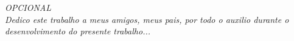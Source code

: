 \begin{dedicatoria}
   \vspace*{\fill}
   \centering
   \noindent
   \textit{ 
   OPCIONAL\\ Dedico este trabalho a meus amigos, meus pais, por todo o auxilio durante o desenvolvimento do presente trabalho...} 
   
   \vspace*{\fill}
\end{dedicatoria}

